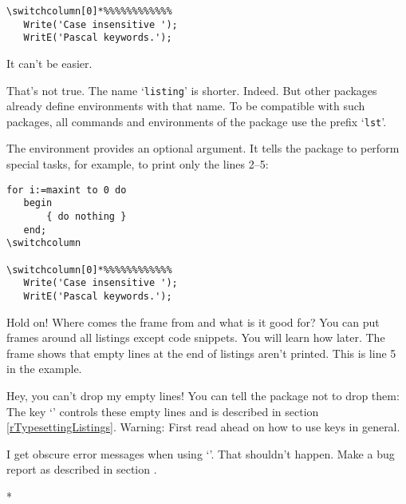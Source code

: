 \begin{paracol}{2}
\begin{paracol}{2}
{\begin{lstsample}[lstlisting]{}{}
\begin{lstlisting}
\switchcolumn[0]*%%%%%%%%%%%%
   Write('Case insensitive ');
   WritE('Pascal keywords.');
   \end{lstlisting}
\end{lstsample}
It can't be easier.
\begin{advise}
\item That's not true. The name `\texttt{listing}' is shorter.
      \advisespace
      Indeed. But other packages already define environments with that name.
      To be compatible with such packages, all commands and environments of
      the  package use the prefix `\texttt{lst}'.
\end{advise}
The environment provides an optional argument. It tells the package to
perform special tasks, for example, to print only the lines 2--5:
\begin{lstsample}{\lstset{frame=trbl,framesep=0pt}\label{gFirstKey=ValueList}}{}
   \begin{lstlisting}[firstline=2,
                      lastline=5]
   for i:=maxint to 0 do
   begin
       { do nothing }
   end;
\switchcolumn

\switchcolumn[0]*%%%%%%%%%%%%
   Write('Case insensitive ');
   WritE('Pascal keywords.');
   \end{lstlisting}
\end{lstsample}
\begin{advise}
\item Hold on! Where comes the frame from and what is it good for?
      \advisespace
      You can put frames around all listings except code snippets.
      You will learn how later. The frame shows that empty lines at the end
      of listings aren't printed. This is line 5 in the example.
\item Hey, you can't drop my empty lines!
      \advisespace
      You can tell the package not to drop them:
      The key `' controls these empty lines and is
      described in section \ref{rTypesettingListings}. Warning: First
      read ahead on how to use keys in general.
\item I get obscure error messages when using `'.
      \advisespace
      That shouldn't happen. Make a bug report as described in section
      .
\end{advise}
\switchcolumn

\switchcolumn[0]*%
}
\end{paracol}
\end{paracol}
